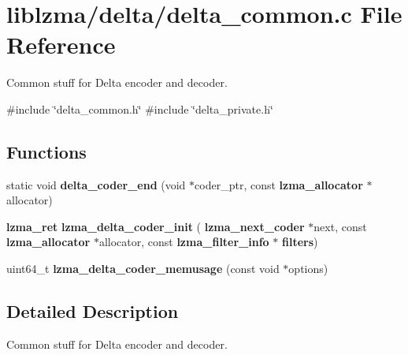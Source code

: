 \section{liblzma/delta/delta\+\_\+common.c File Reference}
\label{delta__common_8c}


Common stuff for Delta encoder and decoder.  


{\ttfamily \#include \char`\"{}delta\+\_\+common.\+h\char`\"{}}\newline
{\ttfamily \#include \char`\"{}delta\+\_\+private.\+h\char`\"{}}\newline
\subsection*{Functions}
\begin{DoxyCompactItemize}
\item 
\mbox{\label{delta__common_8c_a7c763f56ad4735987f09516f8ef5abe6}} 
static void {\bfseries delta\+\_\+coder\+\_\+end} (void $\ast$coder\+\_\+ptr, const \textbf{ lzma\+\_\+allocator} $\ast$allocator)
\item 
\mbox{\label{delta__common_8c_ab2ddc82a7ee7b360fb22dd0612bc96e9}} 
\textbf{ lzma\+\_\+ret} {\bfseries lzma\+\_\+delta\+\_\+coder\+\_\+init} (\textbf{ lzma\+\_\+next\+\_\+coder} $\ast$next, const \textbf{ lzma\+\_\+allocator} $\ast$allocator, const \textbf{ lzma\+\_\+filter\+\_\+info} $\ast$\textbf{ filters})
\item 
\mbox{\label{delta__common_8c_aa2e090c4f9f8f30d83007a5f2053bf9f}} 
uint64\+\_\+t {\bfseries lzma\+\_\+delta\+\_\+coder\+\_\+memusage} (const void $\ast$options)
\end{DoxyCompactItemize}


\subsection{Detailed Description}
Common stuff for Delta encoder and decoder. 


